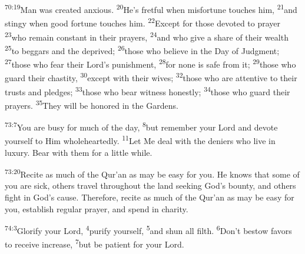 \documentclass[openany,12pt,english]{book}
\newenvironment{para}{\par\pretolerance=100\tolerance=200\setlength{\emergencystretch}{0.6em}\relax}{\par}
\begin{document}
\begin{para}
    \textsuperscript{70:19}\thinspace{}Man was cre\-at\-ed anx\-ious.
    \textsuperscript{20}\thinspace{}He's fret\-ful when mis\-for\-tune touches him,
    \textsuperscript{21}\thinspace{}and stin\-gy when good for\-tune touches him.
    \textsuperscript{22}\thinspace{}Ex\-cept for those de\-vot\-ed to pray\-er
    \textsuperscript{23}\thinspace{}who re\-main con\-stant in their prayers,
    \textsuperscript{24}\thinspace{}and who give a share of their wealth
    \textsuperscript{25}\thinspace{}to beggars and the de\-prived;
    \textsuperscript{26}\thinspace{}those who be\-lieve in the Day of Judg\-ment;
    \textsuperscript{27}\thinspace{}those who fear their Lord's pun\-ish\-ment,
    \textsuperscript{28}\thinspace{}for none is safe from it;
    \textsuperscript{29}\thinspace{}those who guard their chas\-ti\-ty,
    \textsuperscript{30}\thinspace{}ex\-cept with their wives;
    \textsuperscript{32}\thinspace{}those who are at\-ten\-tive to their trusts and pledges;
    \textsuperscript{33}\thinspace{}those who bear wit\-ness hon\-est\-ly;
    \textsuperscript{34}\thinspace{}those who guard their prayers.
    \textsuperscript{35}\thinspace{}They will be honored in the Gardens.
\end{para}

\bigskip{}

\begin{para}
    \textsuperscript{73:7}\thinspace{}You are bus\-y for much of the day,
    \textsuperscript{8}\thinspace{}but re\-mem\-ber your Lord and de\-vote your\-self to Him whole\-heart\-ed\-ly.
    \textsuperscript{11}\thinspace{}Let Me deal with the deniers who live in lux\-u\-ry. Bear with them for a lit\-tle while.
\end{para}

\begin{para}
    \textsuperscript{73:20}\thinspace{}Re\-cite as much of the Qur'an as may be eas\-y for you. He knows that some of you are sick, others trav\-el through\-out the land seek\-ing God's boun\-ty, and others fight in God's cause. There\-fore, re\-cite as much of the Qur'an as may be eas\-y for you, es\-tab\-lish reg\-u\-lar pray\-er, and spend in char\-i\-ty.
\end{para}

\bigskip{}

\begin{para}
    \textsuperscript{74:3}\thinspace{}Glo\-ri\-fy your Lord,
    \textsuperscript{4}\thinspace{}pu\-ri\-fy your\-self,
    \textsuperscript{5}\thinspace{}and shun all filth.
    \textsuperscript{6}\thinspace{}Don't be\-stow fa\-vors to re\-ceive in\-crease,
    \textsuperscript{7}\thinspace{}but be pa\-tient for your Lord.
\end{para}
\end{document}
